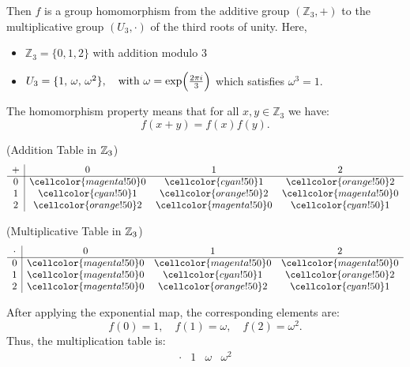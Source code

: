 \documentclass[11pt,openany]{article}
\begin{document}
\begin{observation}
\begin{center}
\begin{tikzpicture}[scale=2, >=Stealth]
\end{tikzpicture}
\end{center}
Then $f$ is a group homomorphism from the additive group \((\mathbb{Z}_3, +)\) to the multiplicative group \( (U_3, \cdot) \) of the third roots of unity. Here, \begin{itemize}
	\item \(\mathbb{Z}_3=\{0,1,2\}\) with addition modulo 3
	\item $U_3=\{1,\,\omega,\,\omega^2\},\quad \text{with } \omega=\exp\Bigl(\frac{2\pi i}{3}\Bigr)$ which satisfies \(\omega^3=1\).
\end{itemize} The homomorphism property means that for all \(x,y\in\mathbb{Z}_3\) we have: \[
f(x+y)=f(x)f(y).
\]
\noindent
\begin{center}
\begin{minipage}{.49\textwidth}
(Addition Table in $\Z_3$) \[
\begin{array}{c|ccc}
	+ & 0 & 1 & 2 \\
	\hline
	0 & \cellcolor{magenta!50}0 & \cellcolor{cyan!50}1 & \cellcolor{orange!50}2 \\
	1 & \cellcolor{cyan!50}1 & \cellcolor{orange!50}2 & \cellcolor{magenta!50}0 \\
	2 & \cellcolor{orange!50}2 & \cellcolor{magenta!50}0 & \cellcolor{cyan!50}1
\end{array}
\]
\end{minipage}
\begin{minipage}{.49\textwidth}
(Multiplicative Table in $\Z_3$) \[
\begin{array}{c|ccc}
	\cdot & 0 & 1 & 2 \\
	\hline
	0 & \cellcolor{magenta!50}0 & \cellcolor{magenta!50}0 & \cellcolor{magenta!50}0 \\
	1 & \cellcolor{magenta!50}0 & \cellcolor{cyan!50}1 & \cellcolor{orange!50}2 \\
	2 & \cellcolor{magenta!50}0 & \cellcolor{orange!50}2 & \cellcolor{cyan!50}1
\end{array}
\]
\end{minipage}
\end{center}\vspace{10pt}
After applying the exponential map, the corresponding elements are:
\[
f(0)=1,\quad f(1)=\omega,\quad f(2)=\omega^2.
\]
Thus, the multiplication table is:
\[
\begin{array}{c|ccc}
	\cdot & 1 & \omega & \omega^2 \\

\end{array}\]
\end{observation}
\end{document}
